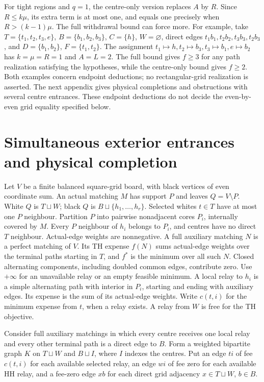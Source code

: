 \documentclass[11pt]{article}
\begin{document}
For tight regions and $q=1$, the centre-only version replaces $A$ by $R$.
Since $R\le k\mu$, its
extra term is at most one, and equals one precisely when
$R>(k-1)\mu$. The full withdrawal bound can force more. For example,
take $T=\{t_1,t_2,t_3,e\}$, $B=\{b_1,b_2,b_3\}$, $C=\{h\}$,
$W=\varnothing$, direct edges $t_1b_1,t_2b_2,t_3b_3,t_2b_3$, and
$D=\{b_1,b_2\}$, $F=\{t_1,t_2\}$. The assignment
$t_1\mapsto h,t_2\mapsto b_3,t_3\mapsto b_1,e\mapsto b_2$ has
$k=\mu=R=1$ and $A=L=2$. The full bound gives $f\ge3$ for any path
realization satisfying the hypotheses, while the centre-only bound gives
$f\ge2$. Both examples concern endpoint deductions; no rectangular-grid
realization is asserted. The next appendix gives physical completions and
obstructions with several centre entrances. These endpoint deductions do
not decide the even-by-even grid equality specified below.


\section{Simultaneous exterior entrances and physical completion}

Let $V$ be a finite balanced square-grid board, with black vertices of
even coordinate sum. An actual matching $M$ has support $P$ and leaves
$Q=V\setminus P$. White $Q$ is $T\sqcup W$; black $Q$ is $B\sqcup
\{h_1,\ldots,h_r\}$. Selected whites $t\in T$ have at most one $P$
neighbour. Partition $P$ into pairwise nonadjacent cores $P_i$, internally
covered by $M$. Every $P$ neighbour of $h_i$ belongs to $P_i$, and centres
have no direct $T$ neighbour. Actual-edge weights are nonnegative.
A full auxiliary matching $N$ is a perfect matching of $V$. Its TH
expense $f(N)$ sums actual-edge weights over the terminal paths starting
in $T$, and $f^*$ is the minimum over all such $N$. Closed alternating
components, including doubled common edges, contribute zero. Use
$+\infty$ for an unavailable relay or an empty feasible minimum.
A local relay to $h_i$ is a simple alternating path with interior in $P_i$,
starting and ending with auxiliary edges. Its expense is the sum of its
actual-edge weights. Write $c(t,i)$ for the minimum expense from $t$,
when a relay exists. A relay from $W$ is free for the TH objective.

Consider full auxiliary matchings in which every centre receives one
local relay and every other terminal path is a direct edge to $B$.
Form a weighted bipartite graph $K$ on $T\sqcup W$ and $B\sqcup I$,
where $I$ indexes the centres. Put an edge $t i$ of fee $c(t,i)$ for
each available selected relay, an edge $wi$ of fee zero for each
available HH relay, and a fee-zero edge $xb$ for each direct grid
adjacency $x\in T\sqcup W$, $b\in B$.
\end{document}
